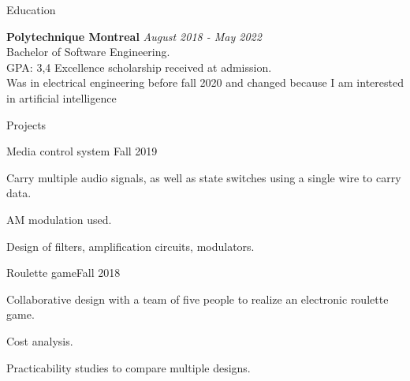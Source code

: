 \documentclass[french,12pt]{resume} %
\begin{document}
	
	
	\begin{rSection}{Education}
		
		{\bf Polytechnique Montreal} \hfill {\em August 2018 - May 2022} 
		\\ Bachelor of Software Engineering.
		\\GPA: 3,4 \hspace{0.5cm}  Excellence scholarship received at admission.
		\\Was in electrical engineering before fall 2020 and changed because I am interested in artificial intelligence
	\end{rSection}
	
	\begin{rSection}{Projects}
		
		\begin{rSubsection}{Media control system }{Fall 2019}{}{}
			\item   Carry multiple audio signals, as well as state switches using a single wire to carry data.
			\item   AM modulation used.
			\item   Design of filters, amplification circuits, modulators.
			
		\end{rSubsection}
		
%			
		
		\begin{rSubsection}{Roulette game}{Fall 2018}{}{}
			\item  Collaborative design with a team of five people to realize an electronic roulette game.
			\item  Cost analysis.
			\item  Practicability studies to compare multiple designs.
		\end{rSubsection} 
		
	\end{rSection}
	
\end{document}
